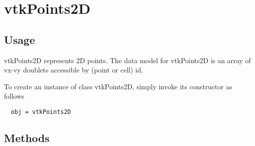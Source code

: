 \section{vtkPoints2D}

\subsection{Usage}

 vtkPoints2D represents 2D points. The data model for vtkPoints2D is an
 array of vx-vy doublets accessible by (point or cell) id.

To create an instance of class vtkPoints2D, simply
invoke its constructor as follows
\begin{verbatim}
  obj = vtkPoints2D
\end{verbatim}
\subsection{Methods}

